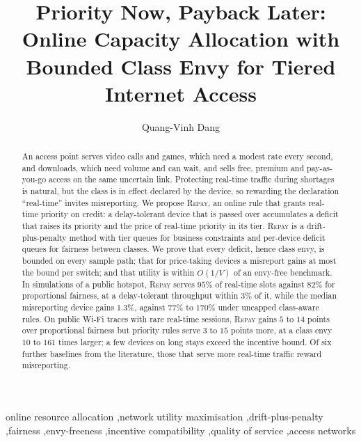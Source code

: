 \documentclass[preprint,11pt]{elsarticle}
\theoremstyle{definition}
\theoremstyle{remark}
\newcommand{\repay}{\textsc{Repay}}
\begin{document}
\begin{frontmatter}

\title{Priority Now, Payback Later: Online Capacity Allocation with Bounded Class Envy for Tiered Internet Access}

\author[buv]{Quang-Vinh Dang}

\begin{abstract}
An access point serves video calls and games, which need a modest rate every second, and downloads, which need volume and can wait, and sells free, premium and pay-as-you-go access on the same uncertain link.
Protecting real-time traffic during shortages is natural, but the class is in effect declared by the device, so rewarding the declaration ``real-time'' invites misreporting.
We propose \repay{}, an online rule that grants real-time priority on credit: a delay-tolerant device that is passed over accumulates a deficit that raises its priority and the price of real-time priority in its tier.
\repay{} is a drift-plus-penalty method with tier queues for business constraints and per-device deficit queues for fairness between classes.
We prove that every deficit, hence class envy, is bounded on every sample path; that for price-taking devices a misreport gains at most the bound per switch; and that utility is within $O(1/V)$ of an envy-free benchmark.
In simulations of a public hotspot, \repay{} serves $95\%$ of real-time slots against $82\%$ for proportional fairness, at a delay-tolerant throughput within $3\%$ of it, while the median misreporting device gains $1.3\%$, against $77\%$ to $170\%$ under uncapped class-aware rules.
On public Wi-Fi traces with rare real-time sessions, \repay{} gains $5$ to $14$ points over proportional fairness but priority rules serve $3$ to $15$ points more, at a class envy $10$ to $161$ times larger; a few devices on long stays exceed the incentive bound.
Of six further baselines from the literature, those that serve more real-time traffic reward misreporting.
\end{abstract}

\begin{keyword}
online resource allocation \sep network utility maximisation \sep drift-plus-penalty \sep fairness \sep envy-freeness \sep incentive compatibility \sep quality of service \sep access networks
\end{keyword}

\end{frontmatter}
\end{document}

